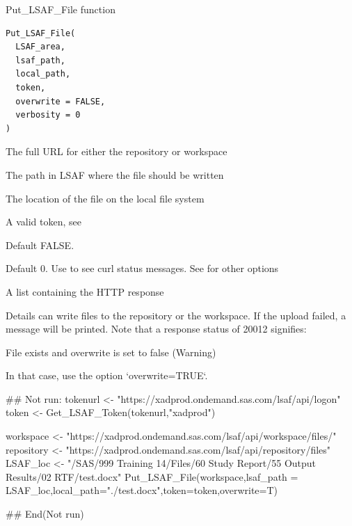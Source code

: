 \documentclass[a4paper]{book}
\begin{document}
%
\begin{Description}
Put\_LSAF\_File function
\end{Description}
%
\begin{Usage}
\begin{verbatim}
Put_LSAF_File(
  LSAF_area,
  lsaf_path,
  local_path,
  token,
  overwrite = FALSE,
  verbosity = 0
)
\end{verbatim}
\end{Usage}
%
\begin{Arguments}
\begin{ldescription}
\item[\code{LSAF\_area}] The full URL for either the repository or workspace

\item[\code{lsaf\_path}] The path in LSAF where the file should be written

\item[\code{local\_path}] The location of the file on the local file system

\item[\code{token}] A valid token, see 

\item[\code{overwrite}] Default FALSE.

\item[\code{verbosity}] Default 0. Use  to see curl status
messages. See  for other options
\end{ldescription}
\end{Arguments}
%
\begin{Value}
A list containing the HTTP response
\end{Value}
%
\begin{Section}{Details}
 can write files to the repository
or the workspace. If the upload failed, a message will be printed.
Note that a response status of 20012 signifies:

File exists and overwrite is set to false (Warning)

In that case, use the option `overwrite=TRUE`.
\end{Section}
%
\begin{Examples}
\begin{ExampleCode}
## Not run: 
 tokenurl <- "https://xadprod.ondemand.sas.com/lsaf/api/logon"
 token <- Get_LSAF_Token(tokenurl,"xadprod")

 workspace <- "https://xadprod.ondemand.sas.com/lsaf/api/workspace/files/"
 repository <- "https://xadprod.ondemand.sas.com/lsaf/api/repository/files"
 LSAF_loc <- "/SAS/999 Training 14/Files/60 Study Report/55 Output Results/02 RTF/test.docx"
 Put_LSAF_File(workspace,lsaf_path = LSAF_loc,local_path="./test.docx",token=token,overwrite=T)
 
## End(Not run)

\end{ExampleCode}
\end{Examples}
\end{document}
